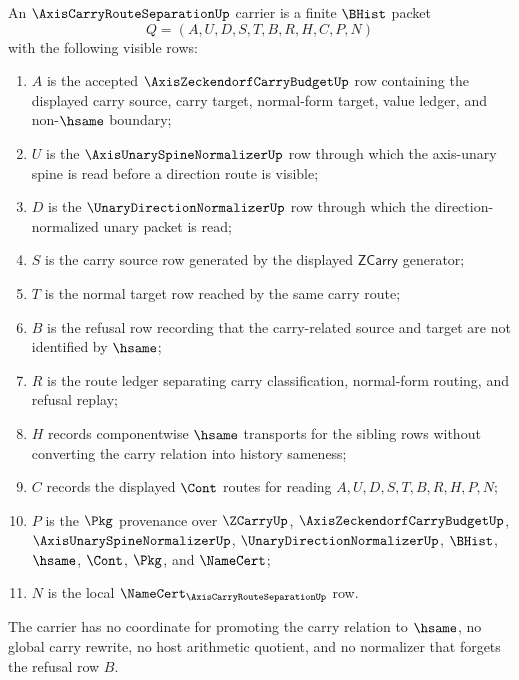 \begin{definition}
\label{def:axis-carry-route-separation-carrier}
An $\AxisCarryRouteSeparationUp$ carrier is a finite $\BHist$ packet
$$
Q=(A,U,D,S,T,B,R,H,C,P,N)
$$
with the following visible rows:
\begin{enumerate}
\item $A$ is the accepted $\AxisZeckendorfCarryBudgetUp$ row containing the displayed carry source, carry target, normal-form target, value ledger, and non-$\hsame$ boundary;
\item $U$ is the $\AxisUnarySpineNormalizerUp$ row through which the axis-unary spine is read before a direction route is visible;
\item $D$ is the $\UnaryDirectionNormalizerUp$ row through which the direction-normalized unary packet is read;
\item $S$ is the carry source row generated by the displayed $\mathsf{ZCarry}$ generator;
\item $T$ is the normal target row reached by the same carry route;
\item $B$ is the refusal row recording that the carry-related source and target are not identified by $\hsame$;
\item $R$ is the route ledger separating carry classification, normal-form routing, and refusal replay;
\item $H$ records componentwise $\hsame$ transports for the sibling rows without converting the carry relation into history sameness;
\item $C$ records the displayed $\Cont$ routes for reading $A,U,D,S,T,B,R,H,P,N$;
\item $P$ is the $\Pkg$ provenance over $\ZCarryUp$, $\AxisZeckendorfCarryBudgetUp$, $\AxisUnarySpineNormalizerUp$, $\UnaryDirectionNormalizerUp$, $\BHist$, $\hsame$, $\Cont$, $\Pkg$, and $\NameCert$;
\item $N$ is the local $\NameCert_{\AxisCarryRouteSeparationUp}$ row.
\end{enumerate}
The carrier has no coordinate for promoting the carry relation to $\hsame$, no global carry rewrite, no host arithmetic quotient, and no normalizer that forgets the refusal row $B$.
\end{definition}

